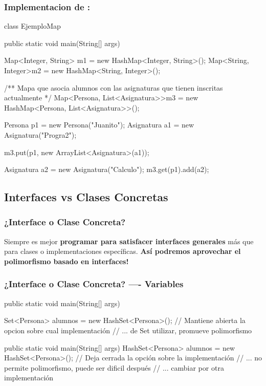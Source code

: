 \documentclass{beamer}
\begin{document}
\begin{frame}[fragile]
  \frametitle{Implementacion de : }

  \begin{jsmall}
    class EjemploMap {
      public static void main(String[] args) {
        Map<Integer, String> m1 = new HashMap<Integer, String>();
        Map<String, Integer>m2 = new HashMap<String, Integer>();

        /** Mapa que asocia alumnos con las
        asignaturas que tienen inscritas actualmente */
        Map<Persona, List<Asignatura>>m3 =
        new HashMap<Persona, List<Asignatura>>();
        
        Persona p1 = new Persona("Juanito");
        Asignatura a1 = new Asignatura("Progra2");
        
        m3.put(p1, new ArrayList<Asignatura>(a1));

        Asignatura a2 = new Asignatura("Calculo");
        m3.get(p1).add(a2);        
      }
    }    
  \end{jsmall}  
\end{frame}

\subsection{Interfaces vs Clases Concretas}

\begin{frame}
  \frametitle{¿Interface o Clase Concreta?}

  \begin{alertblock}{}
    Siempre es mejor \textbf{programar para satisfacer interfaces
      generales} más que para clases o implementaciones
    específicas. \textbf{Así podremos aprovechar el polimorfismo
      basado en interfaces!}
  \end{alertblock}
  
\end{frame}

\begin{frame}[fragile]
  \frametitle{¿Interface o Clase Concreta? ---- Variables}

  \begin{jsmall}
    public static void main(String[] args) {
      Set<Persona> alumnos = new HashSet<Persona>();
      // Mantiene abierta la opcion sobre cual implementación
      // ... de Set utilizar, promueve polimorfismo
      
    }
  \end{jsmall}

  \begin{jsmall}
    public static void main(String[] args) {
      HashSet<Persona> alumnos = new HashSet<Persona>();
      // Deja cerrada la opción sobre la implementación
      // ... no permite polimorfismo, puede ser dificil después
      // ... cambiar por otra implementación
    }
  \end{jsmall}
  
\end{frame}
\end{document}
